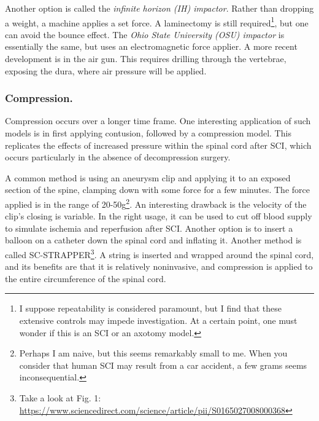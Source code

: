 \documentclass[12pt]{report}
\begin{document}
Another option is called the \textit{infinite horizon (IH) impactor}. Rather than dropping a weight, a machine applies a set force. A laminectomy is still required\footnote{I suppose repeatability is considered paramount, but I find that these extensive controls may impede investigation. At a certain point, one must wonder if this is an SCI or an axotomy model.}, but one can avoid the bounce effect. The \textit{Ohio State University (OSU) impactor} is essentially the same, but uses an electromagnetic force applier. A more recent development is in the air gun. This requires drilling through the vertebrae, exposing the dura, where air pressure will be applied. 


\subsubsection{Compression.}
Compression occurs over a longer time frame. One interesting application of such models is in first applying contusion, followed by a compression model. This replicates the effects of increased pressure within the spinal cord after SCI, which occurs particularly in the absence of decompression surgery.\newline

A common method is using an aneurysm clip and applying it to an exposed section of the spine, clamping down with some force for a few minutes. The force applied is in the range of 20-50g\footnote{Perhaps I am naive, but this seems remarkably small to me. When you consider that human SCI may result from a car accident, a few grams seems inconsequential.}. An interesting drawback is the velocity of the clip's closing is variable. In the right usage, it can be used to cut off blood supply to simulate ischemia and reperfusion after SCI. Another option is to insert a balloon on a catheter down the spinal cord and inflating it. Another method is called SC-STRAPPER\footnote{Take a look at Fig. 1: \url{https://www.sciencedirect.com/science/article/pii/S0165027008000368} }. A string is inserted and wrapped around the spinal cord, and its benefits are that it is relatively noninvasive, and compression is applied to the entire circumference of the spinal cord. 
\end{document}

